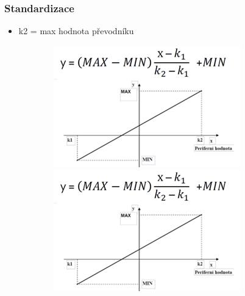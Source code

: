   \subsubsection*{Standardizace}
  \begin{itemize}
\subsection{Standardizace a destandardizace}
\subsubsection*{Standardizace}
\begin{itemize}
    \item Jedná se o převod elektrické veličiny na reálné číslo v příslušných inženýrských jednotkách, které se budou nacházet v zadaných mezích.
    \item Standardizovaná hodnota lze dále uživatelsky využívat - např. zobrazení na operátorském panelu.
    \item x = naměřená hodnota
    \item MAX,MIN = vstupní analogová proměnná (např. teplota)
    \item k1 = min hodnota převodníku
    \item k2 = max hodnota převodníku 
  \end{itemize}
    \item k2 = max hodnota převodníku
\end{itemize}

  \begin{figure}[h]
\begin{figure}[h]
    \begin{center}
      \includegraphics[scale = 1]{img/picture6.png}
        \includegraphics[scale = 1]{img/picture6.png}
    \end{center}
  \end{figure}
\end{figure}

